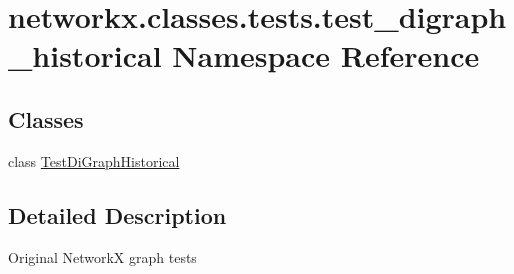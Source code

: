 \hypertarget{namespacenetworkx_1_1classes_1_1tests_1_1test__digraph__historical}{}\section{networkx.\+classes.\+tests.\+test\+\_\+digraph\+\_\+historical Namespace Reference}
\label{namespacenetworkx_1_1classes_1_1tests_1_1test__digraph__historical}
\subsection*{Classes}
\begin{DoxyCompactItemize}
\item 
class \hyperlink{classnetworkx_1_1classes_1_1tests_1_1test__digraph__historical_1_1TestDiGraphHistorical}{Test\+Di\+Graph\+Historical}
\end{DoxyCompactItemize}


\subsection{Detailed Description}
\begin{DoxyVerb}Original NetworkX graph tests\end{DoxyVerb}
 